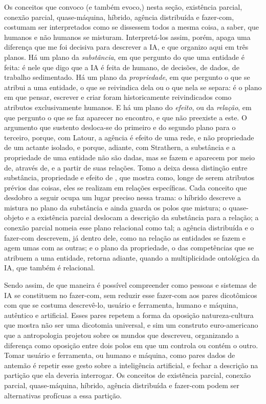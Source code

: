 Os conceitos que convoco (e também evoco,) nesta seção, existência parcial, conexão parcial, quase-máquina, híbrido, agência distribuída e fazer-com, costumam ser interpretados como se dissessem todos a mesma coisa, a saber, que humanos e não humanos se misturam. Interpretá-los assim, porém, apaga uma diferença que me foi decisiva para descrever a IA, e que organizo aqui em três planos. Há um plano da \emph{substância}, em que pergunto do que uma entidade é feita: é nele que digo que a IA é feita de humano, de decisões, de dados, de trabalho sedimentado. Há um plano da \emph{propriedade}, em que pergunto o que se atribui a uma entidade, o que se reivindica dela ou o que nela se separa: é o plano em que pensar, escrever e criar foram historicamente reivindicados como atributos exclusivamente humanos. E há um plano do \emph{efeito}, ou da \textit{relação}, em que pergunto o que se faz aparecer no encontro, e que não preexiste a este. O argumento que sustento desloca-se do primeiro e do segundo plano para o terceiro, porque, com Latour, a agência é efeito de uma rede, e não propriedade de um actante isolado, e porque, adiante, com Strathern, a substância e a propriedade de uma entidade não são dadas, mas se fazem e aparecem por meio de, através de, e a partir de suas relações. Tomo a deixa dessa distinção entre substância, propriedade e efeito de \textcite{strathern2000pse}, que mostra como, longe de serem atributos prévios das coisas, eles se realizam em relações específicas. Cada conceito que desdobro a seguir ocupa um lugar preciso nessa trama: o híbrido descreve a mistura no plano da substância e ainda guarda os polos que mistura; o quase-objeto e a existência parcial deslocam a descrição da substância para a relação; a conexão parcial nomeia esse plano relacional como tal; a agência distribuída e o fazer-com descrevem, já dentro dele, como na relação as entidades se fazem e agem umas com as outras; e o plano da propriedade, o das competências que se atribuem a uma entidade, retorna adiante, quando a multiplicidade ontológica da IA, que também é relacional.

Sendo assim, de que maneira é possível compreender como pessoas e sistemas de IA se constituem no fazer-com, sem reduzir esse fazer-com aos pares dicotômicos com que se costuma descrevê-lo, usuário e ferramenta, humano e máquina, autêntico e artificial. Esses pares repetem a forma da oposição natureza-cultura que \textcite[pp.~30--31]{strathern2014efeito} mostra não ser uma dicotomia universal, e sim um construto euro-americano que a antropologia projetou sobre os mundos que descreveu, organizando a diferença como oposição entre dois polos em que um controla ou contém o outro. Tomar usuário e ferramenta, ou humano e máquina, como pares dados de antemão é repetir esse gesto sobre a inteligência artificial, e fechar a descrição na partição que ela deveria interrogar. Os conceitos de existência parcial, conexão parcial, quase-máquina, híbrido, agência distribuída e fazer-com podem ser alternativas profícuas a essa partição. 

